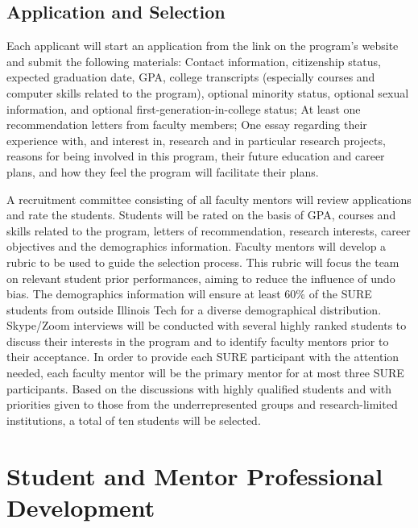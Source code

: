 \documentclass[11pt]{NSFamsart}
\begin{document}
\subsection{Application and Selection} Each applicant will start an application from the link on the program’s
website and submit the following materials: 
Contact information, citizenship status, expected graduation date, GPA, college transcripts (especially courses and computer skills related to the program),
optional minority status, optional sexual information, and optional first-generation-in-college status;
At least one recommendation
letters from faculty members; 
One essay regarding their experience with, and interest in, research and in particular research projects, reasons for being involved in this program, their future
education and career plans, and how they feel the program will facilitate their plans. 

A recruitment committee consisting of all faculty mentors will review applications and rate the students. Students
will be rated on the basis of GPA, courses and skills related to the program, letters of recommendation,
research interests, career objectives and the demographics information. Faculty mentors
will develop a rubric to be used to guide the selection
process. This rubric will focus the team on relevant student prior performances, aiming to reduce the
influence of undo bias. The demographics information will ensure at least 60\% of the SURE students
from outside Illinois Tech for a diverse demographical distribution. Skype/Zoom interviews will be conducted
with several highly ranked students to discuss their interests in the program and to identify faculty
mentors prior to their acceptance. In order to provide each SURE participant with the attention needed,
each faculty mentor will be the primary mentor for at most three SURE participants. Based on the
discussions with highly qualified students and with priorities given to those from the underrepresented
groups and research-limited institutions, a total of ten students will be selected.

\section{Student and Mentor Professional Development}
\end{document}
